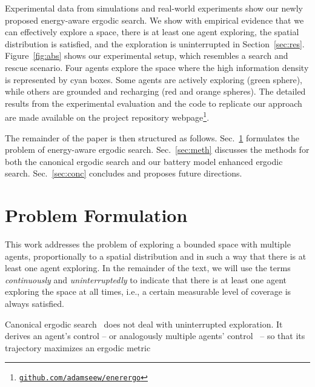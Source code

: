 \documentclass[letterpaper,10pt,conference,twoside]{IEEEtran}
\theoremstyle{definition}
\begin{document}
Experimental data from simulations and real-world experiments show %
our newly proposed energy-aware ergodic search. 
We show with empirical evidence that we can effectively explore a space, %
there is %
at least one agent exploring, the spatial distribution is satisfied, and the exploration is %
uninterrupted in Section~\ref{sec:res}. 
Figure~\ref{fig:abs} shows our experimental setup, which resembles a search and rescue scenario. Four agents explore the space where the high information density is represented by cyan boxes. Some agents are actively exploring (green sphere), while others are grounded and recharging (red and orange spheres). 
The detailed results from the experimental evaluation and the code to replicate our approach are made available on the project repository webpage\footnote{\label{reflink}{\tt\footnotesize\href{https://github.com/adamseew/enerergo}{github.com/adamseew/enerergo}}}.

The remainder of the paper is then structured as follows. Sec.~\ref{sec:pb} formulates the problem of energy-aware ergodic search. Sec.~\ref{sec:meth} discusses the methods for both the canonical ergodic search and our battery model enhanced ergodic search. Sec.~\ref{sec:conc} concludes and proposes future directions.


\section{Problem Formulation}\label{sec:pb}
\noindent
This work addresses the problem of exploring a bounded space with multiple agents, proportionally to a spatial distribution and in such a way that there is at least one agent exploring. 
%
In the remainder of the text, we will use the terms \textit{continuously} and \textit{uninterruptedly} to indicate that there is at least one agent exploring the space at all times, i.e., a certain measurable level of coverage is always satisfied.

Canonical ergodic search~\cite{mathew2011metrics,miller2013trajectory,abraham2021ergodic,miller2016ergodic,dressel2018optimality,torre2016ergodic,shetty2022ergodic} does not deal with uninterrupted exploration. It derives an agent's control -- or analogously multiple agents' control~\cite{prabhakar2020ergodic,coffin2022multi,lerch2023safety,abraham2018decentralized,patel2021multi} -- so that its trajectory maximizes an ergodic metric %
\end{document}
